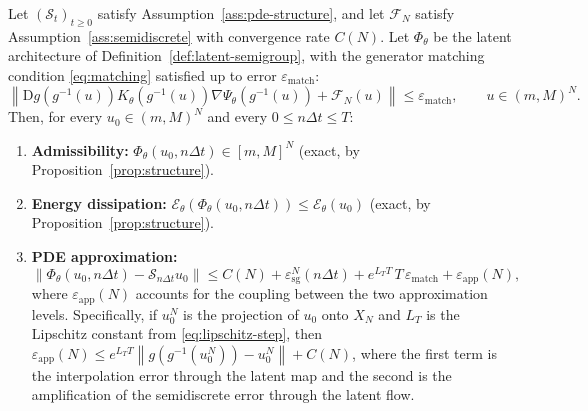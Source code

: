 \documentclass[hidelinks,review,nohypdvips,onefignum,onetabnum]{siamart220329}
\newcommand{\cS}{\mathcal{S}}
\newcommand{\cE}{\mathcal{E}}
\newcommand{\cFN}{\mathcal{F}_N}
\newcommand{\PhiT}{\Phi_{\theta}}
\newcommand{\norm}[1]{\left\lVert #1 \right\rVert}
\begin{document}
\begin{theorem}\label{thm:transfer}
Let $(\cS_t)_{t\ge 0}$ satisfy Assumption~\ref{ass:pde-structure}, and let $\cFN$ satisfy Assumption~\ref{ass:semidiscrete} with convergence rate $C(N)$. Let $\PhiT$ be the latent architecture of Definition~\ref{def:latent-semigroup}, with the generator matching condition \eqref{eq:matching} satisfied up to error $\varepsilon_{\mathrm{match}}$:
\begin{equation}\label{eq:matching-error}
\norm{\mathrm{D}g(g^{-1}(u))K_{\theta}(g^{-1}(u))\nabla \Psi_{\theta}(g^{-1}(u))+\cFN(u)}\le \varepsilon_{\mathrm{match}}, \qquad u\in (m,M)^N.
\end{equation}
Then, for every $u_0\in (m,M)^N$ and every $0\le n\Delta t\le T$:
\begin{enumerate}[label=(\roman*)]
    \item \textbf{Admissibility:} $\PhiT(u_0,n\Delta t)\in [m,M]^N$ (exact, by Proposition~\ref{prop:structure}).
    \item \textbf{Energy dissipation:} $\cE_{\theta}(\PhiT(u_0,n\Delta t))\le \cE_{\theta}(u_0)$ (exact, by Proposition~\ref{prop:structure}).
    \item \textbf{PDE approximation:}
    \begin{equation}\label{eq:transfer-bound}
    \norm{\PhiT(u_0,n\Delta t)-\cS_{n\Delta t}u_0}\le C(N)+\varepsilon_{\mathrm{sg}}^N(n\Delta t)+e^{L_TT}\,T\,\varepsilon_{\mathrm{match}}+\varepsilon_{\mathrm{app}}(N),
    \end{equation}
    where $\varepsilon_{\mathrm{app}}(N)$ accounts for the coupling between the two approximation levels. Specifically, if $u_0^N$ is the projection of $u_0$ onto $X_N$ and $L_T$ is the Lipschitz constant from \eqref{eq:lipschitz-step}, then $\varepsilon_{\mathrm{app}}(N)\le e^{L_TT}\norm{g(g^{-1}(u_0^N))-u_0^N}+C(N)$, where the first term is the interpolation error through the latent map and the second is the amplification of the semidiscrete error through the latent flow.
\end{enumerate}
\end{theorem}
\end{document}
